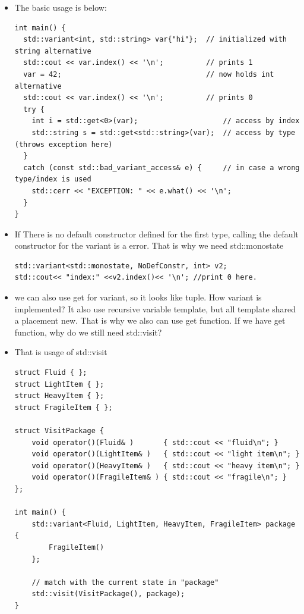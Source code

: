 \documentclass[a4paper,11pt,twoside]{book}
\begin{document}
\begin{itemize}
\item The basic usage is below: 

\begin{lstlisting}
int main() {
  std::variant<int, std::string> var{"hi"};  // initialized with string alternative
  std::cout << var.index() << '\n';          // prints 1
  var = 42;                                  // now holds int alternative
  std::cout << var.index() << '\n';          // prints 0
  try {
    int i = std::get<0>(var);                    // access by index
    std::string s = std::get<std::string>(var);  // access by type (throws exception here)
  }
  catch (const std::bad_variant_access& e) {     // in case a wrong type/index is used
    std::cerr << "EXCEPTION: " << e.what() << '\n';
  }
}
\end{lstlisting}

\item If There is no default constructor defined for the first type, calling the default constructor for the variant is a error. That is why we need std::monostate

\begin{lstlisting}
std::variant<std::monostate, NoDefConstr, int> v2;
std::cout<< "index:" <<v2.index()<< '\n'; //print 0 here.
\end{lstlisting}

\item we can also use get for variant, so it looks like tuple. How variant is implemented? It also use recursive variable template, but all template shared a placement new. That is why we also can use get function. If we have get function, why do we still need std::visit?

\item That is usage of std::visit
\begin{lstlisting}
struct Fluid { };
struct LightItem { };
struct HeavyItem { };
struct FragileItem { };

struct VisitPackage {
    void operator()(Fluid& )       { std::cout << "fluid\n"; }
    void operator()(LightItem& )   { std::cout << "light item\n"; }
    void operator()(HeavyItem& )   { std::cout << "heavy item\n"; }
    void operator()(FragileItem& ) { std::cout << "fragile\n"; }
};

int main() {
    std::variant<Fluid, LightItem, HeavyItem, FragileItem> package { 
        FragileItem()
    };
    
    // match with the current state in "package"
    std::visit(VisitPackage(), package);
}
\end{lstlisting}


\end{itemize}
\end{document}
